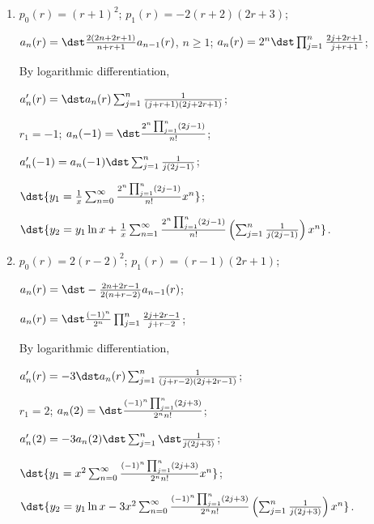 \documentclass[openany]{book}
\newenvironment{sectionSolutions}{
 \begin{enumerate}[item-label={\thesection.\arabic{enumi}.}]
}{
 \end{enumerate}
}
\begin{document}
\begin{sectionSolutions}
$a_n'(r)=14\dst a_n(r)\sum_{j=1}^n\frac{1}{(2j+2r-3)(3j+3r-1)}$;

$r_1=1/3$;
$a_n(1/3)=\dst\frac{(-1)^n\prod_{j=1}^n(6j-7)^2}{81^n(n!)^2}$;

$a_n'(1/3)=\dst14a_n(1/3)
\sum_{j=1}^n\frac{1}{ j(6j-7)})$;

$\dst{y_1=x^{1/3}\sum_{n=0}^\infty\frac{(-1)^n\prod_{j=1}^n(6j-7)^2}{
81^n(n!)^2}
x^n}$;

$\dst{y_2=y_1\ln
x+14x^{1/3}\sum_{n=1}^\infty\frac{(-1)^n\prod_{j=1}^n(6j-7)^2}{
81^n(n!)^2}\left(\sum_{j=1}^n\frac{1}{ j(6j-7)})\right)x^n}$.


\item
$p_0(r)=(r+1)^2$;
$p_1(r)=-2(r+2)(2r+3)$;

$a_n(r)=\dst\frac{2(2n+2r+1)}{ n+r+1}
a_{n-1}(r)$, $n\ge1$;
 $a_n(r)=2^n\dst\prod_{j=1}^n\frac{2j+2r+1}{ j+r+1}$;

By logarithmic differentiation,

$a_n'(r)=\dst a_n(r)\sum_{j=1}^n\frac{1}{(j+r+1)(2j+2r+1)}$;

$r_1=-1$;
$a_n(-1)=\dst\frac{2^n\prod_{j=1}^n(2j-1)}{ n!}$;

$a_n'(-1)=a_n(-1)\dst\sum_{j=1}^n\frac{1}{ j(2j-1)}$;

$\dst{y_1=\frac{1}{ x}\sum_{n=0}^\infty \frac{2^n\prod_{j=1}^n(2j-1)}{ n!}
x^n}$;

$\dst{y_2=y_1\ln
x+\frac{1}{ x}\sum_{n=1}^\infty\frac{2^n\prod_{j=1}^n(2j-1)}{ n!}
\left(\sum_{j=1}^n\frac{1}{ j(2j-1)}\right)x^n}$.



\item
$p_0(r)=2(r-2)^2$;
$p_1(r)=(r-1)(2r+1)$;

$a_n(r)=\dst-\frac{2n+2r-1}{2(n+r-2)}a_{n-1}(r)$;

 $a_n(r)=\dst\frac{(-1)^n}{ 2^n}\prod_{j=1}^n\frac{2j+2r-1}{ j+r-2}$;

By logarithmic differentiation,

$a_n'(r)=-3\dst a_n(r)\sum_{j=1}^n\frac{1}{(j+r-2)(2j+2r-1)}$;

$r_1=2$;
$a_n(2)=\dst\frac{(-1)^n\prod_{j=1}^n(2j+3)}{2^nn!}$;

$a_n'(2)=-3a_n(2)\dst\sum_{j=1}^n\dst\frac{1}{ j(2j+ 3)}$;

$\dst{y_1=x^2\sum_{n=0}^\infty
\frac{(-1)^n\prod_{j=1}^n(2j+3)}{2^nn!}x^n}$;

$\dst{y_2=y_1\ln x-3x^2\sum_{n=0}^\infty
\frac{(-1)^n\prod_{j=1}^n(2j+3)}{2^nn!}
\left(\sum_{j=1}^n\frac{1}{ j(2j+ 3)}\right)x^n}$.



\end{sectionSolutions}
\end{document}

